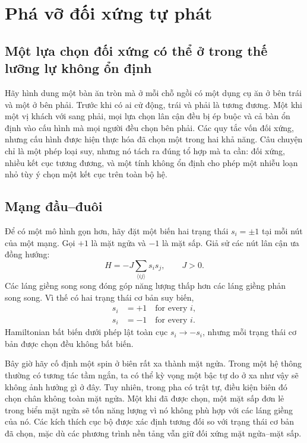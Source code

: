 \section{Phá vỡ đối xứng tự phát}

\subsection{Một lựa chọn đối xứng có thể ở trong thế lưỡng lự không ổn định}

Hãy hình dung một bàn ăn tròn mà ở mỗi chỗ ngồi có một dụng cụ ăn ở
bên trái và một ở bên phải. Trước khi có ai cử động, trái và phải là
tương đương. Một khi một vị khách với sang phải, mọi lựa chọn lân cận đều bị
ép buộc và cả bàn ổn định vào cấu hình mà mọi người đều chọn bên phải. Các
quy tắc vốn đối xứng, nhưng cấu hình được hiện thực hóa đã chọn một trong hai
khả năng. Câu chuyện chỉ là một phép loại suy, nhưng nó tách ra đúng tổ hợp
mà ta cần: đối xứng, nhiều kết cục tương đương, và một tính không ổn định cho
phép một nhiễu loạn nhỏ tùy ý chọn một kết cục trên toàn bộ hệ.

\subsection{Mạng đầu--đuôi}

Để có một mô hình gọn hơn, hãy đặt một biến hai trạng thái \(s_i=\pm1\) tại mỗi nút của
một mạng. Gọi \(+1\) là mặt ngửa và \(-1\) là mặt sấp. Giả sử các nút lân cận ưa
đồng hướng:
\begin{equation}
  H=-J\sum_{\langle ij\rangle}s_i s_j,
  \qquad J>0.
\end{equation}
Các láng giềng song song đóng góp năng lượng thấp hơn các láng giềng phản
song song. Vì thế có hai trạng thái cơ bản suy biến,
\begin{equation}
\begin{aligned}
  s_i&=+1\quad\text{for every }i,
  \\
  s_i&=-1\quad\text{for every }i.
\end{aligned}
\end{equation}
Hamiltonian bất biến dưới phép lật toàn cục \(s_i\to-s_i\), nhưng mỗi trạng thái
cơ bản được chọn đều không bất biến.

Bây giờ hãy cố định một spin ở biên rất xa thành mặt ngửa. Trong một hệ
thông thường có tương tác tầm ngắn, ta có thể kỳ vọng một bậc tự do ở xa như
vậy sẽ không ảnh hưởng gì ở đây. Tuy nhiên, trong pha có trật tự, điều kiện
biên đó chọn chân không toàn mặt ngửa. Một khi đã được chọn, một mặt
sấp đơn lẻ trong biển mặt ngửa sẽ tốn năng lượng vì nó không phù hợp với các
láng giềng của nó. Các kích thích cục bộ được xác định tương đối so với trạng
thái cơ bản đã chọn, mặc dù các phương trình nền tảng vẫn giữ đối xứng mặt
ngửa--mặt sấp.

